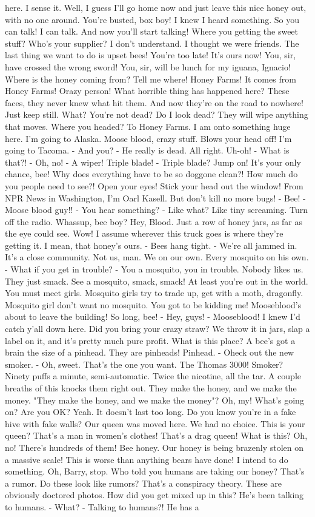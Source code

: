 \documentclass{article}
\begin{document}
here. I sense it. Well, I guess I'll go home now and just leave this nice honey out, with no one around. You're busted, box boy! I knew I heard something. So you can talk! I can talk. And now you'll start talking! Where you getting the sweet stuff? Who's your supplier? I don't understand. I thought we were friends. The last thing we want to do is upset bees! You're too late! It's ours now! You, sir, have crossed the wrong sword! You, sir, will be lunch for my iguana, Ignacio! Where is the honey coming from? Tell me where! Honey Farms! It comes from Honey Farms! Orazy person! What horrible thing has happened here? These faces, they never knew what hit them. And now they're on the road to nowhere! Just keep still. What? You're not dead? Do I look dead? They will wipe anything that moves. Where you headed? To Honey Farms. I am onto something huge here. I'm going to Alaska. Moose blood, crazy stuff. Blows your head off! I'm going to Tacoma. - And you? - He really is dead. All right. Uh-oh! - What is that?! - Oh, no! - A wiper! Triple blade! - Triple blade? Jump on! It's your only chance, bee! Why does everything have to be so doggone clean?! How much do you people need to see?! Open your eyes! Stick your head out the window! From NPR News in Washington, I'm Oarl Kasell. But don't kill no more bugs! - Bee! - Moose blood guy!! - You hear something? - Like what? Like tiny screaming. Turn off the radio. Whassup, bee boy? Hey, Blood. Just a row of honey jars, as far as the eye could see. Wow! I assume wherever this truck goes is where they're getting it. I mean, that honey's ours. - Bees hang tight. - We're all jammed in. It's a close community. Not us, man. We on our own. Every mosquito on his own. - What if you get in trouble? - You a mosquito, you in trouble. Nobody likes us. They just smack. See a mosquito, smack, smack! At least you're out in the world. You must meet girls. Mosquito girls try to trade up, get with a moth, dragonfly. Mosquito girl don't want no mosquito. You got to be kidding me! Mooseblood's about to leave the building! So long, bee! - Hey, guys! - Mooseblood! I knew I'd catch y'all down here. Did you bring your crazy straw? We throw it in jars, slap a label on it, and it's pretty much pure profit. What is this place? A bee's got a brain the size of a pinhead. They are pinheads! Pinhead. - Oheck out the new smoker. - Oh, sweet. That's the one you want. The Thomas 3000! Smoker? Ninety puffs a minute, semi-automatic. Twice the nicotine, all the tar. A couple breaths of this knocks them right out. They make the honey, and we make the money. "They make the honey, and we make the money"? Oh, my! What's going on? Are you OK? Yeah. It doesn't last too long. Do you know you're in a fake hive with fake walls? Our queen was moved here. We had no choice. This is your queen? That's a man in women's clothes! That's a drag queen! What is this? Oh, no! There's hundreds of them! Bee honey. Our honey is being brazenly stolen on a massive scale! This is worse than anything bears have done! I intend to do something. Oh, Barry, stop. Who told you humans are taking our honey? That's a rumor. Do these look like rumors? That's a conspiracy theory. These are obviously doctored photos. How did you get mixed up in this? He's been talking to humans. - What? - Talking to humans?! He has a 
\end{document}
